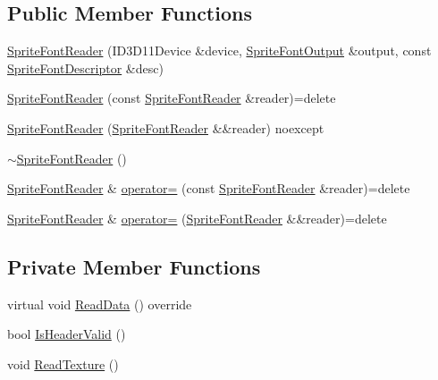 \subsection*{Public Member Functions}
\begin{DoxyCompactItemize}
\item 
\hyperlink{classmage_1_1rendering_1_1loader_1_1_sprite_font_reader_a5cef04ca33ef0047664fa757de6e1b8f}{Sprite\+Font\+Reader} (I\+D3\+D11\+Device \&device, \hyperlink{structmage_1_1rendering_1_1_sprite_font_output}{Sprite\+Font\+Output} \&output, const \hyperlink{classmage_1_1rendering_1_1_sprite_font_descriptor}{Sprite\+Font\+Descriptor} \&desc)
\item 
\hyperlink{classmage_1_1rendering_1_1loader_1_1_sprite_font_reader_a4c96a8d3554084baaf4b24f94a582ac6}{Sprite\+Font\+Reader} (const \hyperlink{classmage_1_1rendering_1_1loader_1_1_sprite_font_reader}{Sprite\+Font\+Reader} \&reader)=delete
\item 
\hyperlink{classmage_1_1rendering_1_1loader_1_1_sprite_font_reader_a71239906b4c7609747d5fe47189883b6}{Sprite\+Font\+Reader} (\hyperlink{classmage_1_1rendering_1_1loader_1_1_sprite_font_reader}{Sprite\+Font\+Reader} \&\&reader) noexcept
\item 
\hyperlink{classmage_1_1rendering_1_1loader_1_1_sprite_font_reader_a206d696476cd2ed6606932c549cd0c6c}{$\sim$\+Sprite\+Font\+Reader} ()
\item 
\hyperlink{classmage_1_1rendering_1_1loader_1_1_sprite_font_reader}{Sprite\+Font\+Reader} \& \hyperlink{classmage_1_1rendering_1_1loader_1_1_sprite_font_reader_a645988b6bba2a4fda93d18c4c9e3d09c}{operator=} (const \hyperlink{classmage_1_1rendering_1_1loader_1_1_sprite_font_reader}{Sprite\+Font\+Reader} \&reader)=delete
\item 
\hyperlink{classmage_1_1rendering_1_1loader_1_1_sprite_font_reader}{Sprite\+Font\+Reader} \& \hyperlink{classmage_1_1rendering_1_1loader_1_1_sprite_font_reader_ac6902b3475ae8425d475de59135a11a3}{operator=} (\hyperlink{classmage_1_1rendering_1_1loader_1_1_sprite_font_reader}{Sprite\+Font\+Reader} \&\&reader)=delete
\end{DoxyCompactItemize}
\subsection*{Private Member Functions}
\begin{DoxyCompactItemize}
\item 
virtual void \hyperlink{classmage_1_1rendering_1_1loader_1_1_sprite_font_reader_ae5b827dade3bd800e2000788efa91e30}{Read\+Data} () override
\item 
bool \hyperlink{classmage_1_1rendering_1_1loader_1_1_sprite_font_reader_a0523d92193229bced5669791524e4ea9}{Is\+Header\+Valid} ()
\item 
void \hyperlink{classmage_1_1rendering_1_1loader_1_1_sprite_font_reader_af43be711f30780c23c9bec7d2ed48feb}{Read\+Texture} ()
\end{DoxyCompactItemize}
